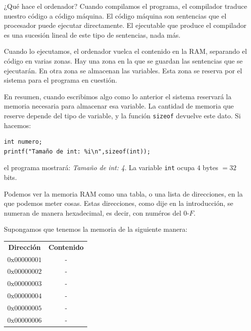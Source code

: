 \documentclass{hxc_cl}
\newcommand{\hex}{0\text{x}}
\begin{document}
¿Qué hace el ordenador? Cuando compilamos el programa, el compilador traduce nuestro código a código máquina. El código máquina son sentencias que el procesador puede ejecutar directamente. El ejecutable que produce el compilador es una sucesión lineal de este tipo de sentencias, nada más.

Cuando lo ejecutamos, el ordenador vuelca el contenido en la RAM, separando el código en varias zonas.  Hay una zona en la que se guardan las sentencias que se ejecutarán. En otra zona se almacenan las variables. Esta zona se reserva por el sistema para el programa en cuestión.

En resumen, cuando escribimos algo como lo anterior el sistema reservará la memoria necesaria para almacenar esa variable. La cantidad de memoria que reserve depende del tipo de variable, y la función \texttt{sizeof} devuelve este dato. Si hacemos:

\begin{lstlisting}
int numero;
printf("Tamaño de int: %i\n",sizeof(int));
\end{lstlisting}

el programa mostrará: \textit{Tamaño de int: 4}. La variable \texttt{int} ocupa $4$ bytes $=32$ bits.

Podemos ver la memoria RAM como una tabla, o una lista de direcciones, en la que podemos meter cosas. Estas direcciones, como dije en la introducción, se numeran de manera hexadecimal, es decir, con numéros del $0$-$F$.

Supongamos que tenemos la memoria de la siguiente manera:

\begin{center}
\begin{tabular}{cc}
{\bf Dirección} & {\bf Contenido} \\
$\hex00000001$ & - \\
$\hex00000002$ & - \\
$\hex00000003 $ & - \\
$\hex00000004  $ & - \\
$\hex00000005   $ & - \\
$\hex00000006   $ & - \\
\end{tabular}

\end{center}
\end{document}

